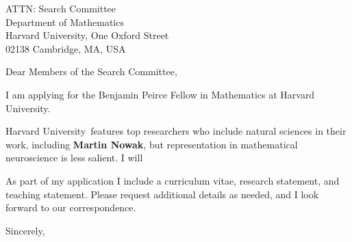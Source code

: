 \documentclass[11pt,a4paper]{letter}
\begin{document}

\def\School{Harvard University}
\begin{letter}
{ATTN: Search Committee\\
Department of Mathematics\\
Harvard University, One Oxford Street\\
02138 Cambridge, MA, USA}


\opening{Dear Members of the Search Committee,}

I am applying for the Benjamin Peirce Fellow in Mathematics at \School. 



\School~features top researchers who include natural sciences in their work, including \textbf{Martin Nowak}, but representation in mathematical neuroscience is less salient. I will 



As part of my application I include a curriculum vitae, research statement, and teaching statement. Please request additional details as needed, and I look forward to our correspondence.

\closing{Sincerely,}
\end{letter}
\end{document}
